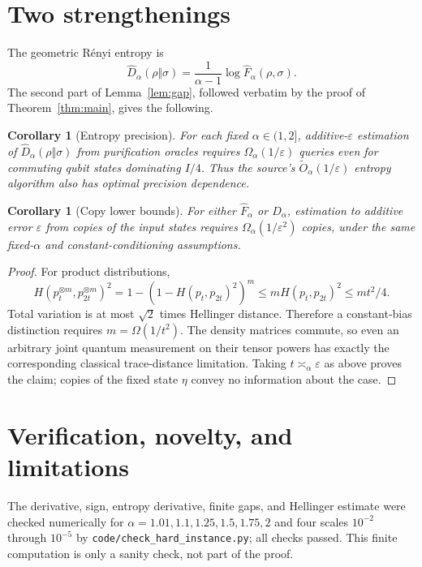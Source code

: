 \documentclass[10pt]{article}
\newtheorem{corollary}[theorem]{Corollary}
\newcommand{\Fh}{\widehat F}
\newcommand{\Dh}{\widehat D}
\newcommand{\eps}{\varepsilon}
\begin{document}
\section{Two strengthenings}

The geometric Rényi entropy is
\[
 \Dh_\alpha(\rho\Vert\sigma)
   =\frac{1}{\alpha-1}\log\Fh_\alpha(\rho,\sigma).
\]
The second part of Lemma~\ref{lem:gap}, followed verbatim by the proof of
Theorem~\ref{thm:main}, gives the following.

\begin{corollary}[Entropy precision]
For each fixed $\alpha\in(1,2]$, additive-$\eps$ estimation of
$\Dh_\alpha(\rho\Vert\sigma)$ from purification oracles requires
$\Omega_\alpha(1/\eps)$ queries even for commuting qubit states dominating
$I/4$.  Thus the source's $\widetilde O_\alpha(1/\eps)$ entropy algorithm also
has optimal precision dependence.
\end{corollary}

\begin{corollary}[Copy lower bounds]
For either $\Fh_\alpha$ or $\Dh_\alpha$, estimation to additive error $\eps$
from copies of the input states requires $\Omega_\alpha(1/\eps^2)$ copies,
under the same fixed-$\alpha$ and constant-conditioning assumptions.
\end{corollary}

\begin{proof}
For product distributions,
\[
 H(p_t^{\otimes m},p_{2t}^{\otimes m})^2
 =1-(1-H(p_t,p_{2t})^2)^m
 \leq mH(p_t,p_{2t})^2\leq mt^2/4.
\]
Total variation is at most $\sqrt2$ times Hellinger distance.  Therefore a
constant-bias distinction requires $m=\Omega(1/t^2)$.  The density matrices
commute, so even an arbitrary joint quantum measurement on their tensor
powers has exactly the corresponding classical trace-distance limitation.
Taking $t\asymp_\alpha\eps$ as above proves the claim; copies of the fixed
state $\eta$ convey no information about the case.
\end{proof}

\section{Verification, novelty, and limitations}

The derivative, sign, entropy derivative, finite gaps, and Hellinger estimate
were checked numerically for $\alpha=1.01,1.1,1.25,1.5,1.75,2$ and four scales
$10^{-2}$ through $10^{-5}$ by \texttt{code/check\_hard\_instance.py}; all
checks passed.  This finite computation is only a sanity check, not part of
the proof.
\end{document}

